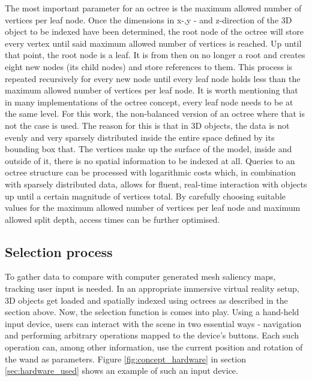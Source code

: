The most important parameter for an octree is the maximum allowed number of vertices per leaf node. Once the dimensions in x-,y - and z-direction of the 3D object to be indexed have been determined, the root node of the octree will store every vertex until said maximum allowed number of vertices is reached. Up until that point, the root node is a leaf. It is from then on no longer a root and creates eight new nodes (its child nodes) and store references to them. This process is repeated recursively for every new node until every leaf node holds less than the maximum allowed number of vertices per leaf node. It is worth mentioning that in many implementations of the octree concept, every leaf node needs to be at the same level. For this work, the non-balanced version of an octree where that is not the case is used. The reason for this is that in 3D objects, the data is not evenly and very sparsely distributed inside the entire space defined by its bounding box that. The vertices make up the surface of the model, inside and outside of it, there is no spatial information to be indexed at all. Queries to an octree structure can be processed with logarithmic costs which, in combination with sparsely distributed data, allows for fluent, real-time interaction with objects up until a certain magnitude of vertices total. By carefully choosing suitable values for the maximum allowed number of vertices per leaf node and maximum allowed split depth, access times can be further optimised.

		\subsection{Selection process}
		\label{sec:selection_process}

To gather data to compare with computer generated mesh saliency maps, tracking user input is needed. In an appropriate immersive virtual reality setup, 3D objects get loaded and spatially indexed using octrees as described in the section above. Now, the selection function is comes into play. Using a hand-held input device, users can interact with the scene in two essential ways - navigation and performing arbitrary operations mapped to the device's buttons. Each such operation can, among other information, use the current position and rotation of the wand as parameters. Figure \ref{fig:concept_hardware} in section \ref{sec:hardware_used} shows an example of such an input device.



